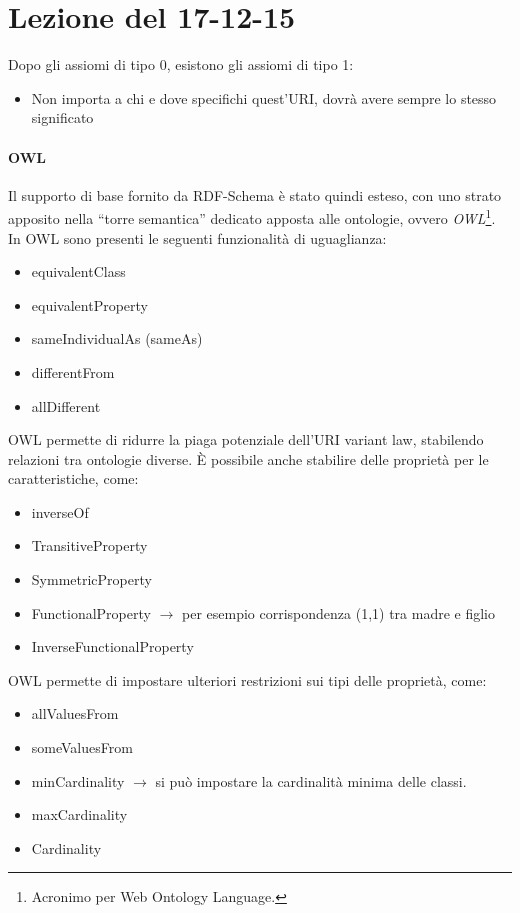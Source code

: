 \section{Lezione del 17-12-15}

Dopo gli assiomi di tipo 0, esistono gli assiomi di tipo 1:
\begin{itemize}

\item[Assioma 1]Non importa a chi e dove specifichi quest'URI, dovr\`a avere sempre lo stesso significato
  
\end{itemize}

\paragraph*{OWL}Il supporto di base fornito da RDF-Schema \`e stato quindi esteso, con uno strato apposito nella ``torre semantica'' dedicato apposta alle ontologie, ovvero \textit{OWL}\footnote{Acronimo per Web Ontology Language.}.
In OWL sono presenti le seguenti funzionalit\`a di uguaglianza:
\begin{itemize}
  
\item equivalentClass
\item equivalentProperty
\item sameIndividualAs (sameAs)
\item differentFrom
\item allDifferent
  
\end{itemize}

OWL permette di ridurre la piaga potenziale dell'URI variant law, stabilendo relazioni tra ontologie diverse. \`E possibile anche stabilire delle propriet\`a per le caratteristiche, come:
\begin{itemize}
\item inverseOf
\item TransitiveProperty
\item SymmetricProperty
\item FunctionalProperty $\to$ per esempio corrispondenza (1,1) tra madre e figlio
\item InverseFunctionalProperty
\end{itemize}
OWL permette di impostare ulteriori restrizioni sui tipi delle propriet\`a, come:
\begin{itemize}
\item allValuesFrom
\item someValuesFrom
\item minCardinality $\to$ si pu\`o impostare la cardinalit\`a minima delle classi.
\item maxCardinality
\item Cardinality
\end{itemize}

